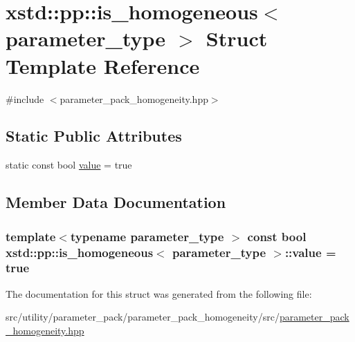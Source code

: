 \hypertarget{structxstd_1_1pp_1_1is__homogeneous_3_01parameter__type_01_4}{\section{xstd\-:\-:pp\-:\-:is\-\_\-homogeneous$<$ parameter\-\_\-type $>$ Struct Template Reference}
\label{structxstd_1_1pp_1_1is__homogeneous_3_01parameter__type_01_4}
}


{\ttfamily \#include $<$parameter\-\_\-pack\-\_\-homogeneity.\-hpp$>$}

\subsection*{Static Public Attributes}
\begin{DoxyCompactItemize}
\item 
static const bool \hyperlink{structxstd_1_1pp_1_1is__homogeneous_3_01parameter__type_01_4_a827e8f99e9ec9a203c3851ecd58dddb6}{value} = true
\end{DoxyCompactItemize}


\subsection{Member Data Documentation}
\hypertarget{structxstd_1_1pp_1_1is__homogeneous_3_01parameter__type_01_4_a827e8f99e9ec9a203c3851ecd58dddb6}{
\subsubsection[{value}]{\setlength{\rightskip}{0pt plus 5cm}template$<$typename parameter\-\_\-type $>$ const bool {\bf xstd\-::pp\-::is\-\_\-homogeneous}$<$ parameter\-\_\-type $>$\-::value = true\hspace{0.3cm}{\ttfamily [static]}}}\label{structxstd_1_1pp_1_1is__homogeneous_3_01parameter__type_01_4_a827e8f99e9ec9a203c3851ecd58dddb6}


The documentation for this struct was generated from the following file\-:\begin{DoxyCompactItemize}
\item 
src/utility/parameter\-\_\-pack/parameter\-\_\-pack\-\_\-homogeneity/src/\hyperlink{parameter__pack__homogeneity_8hpp}{parameter\-\_\-pack\-\_\-homogeneity.\-hpp}\end{DoxyCompactItemize}
